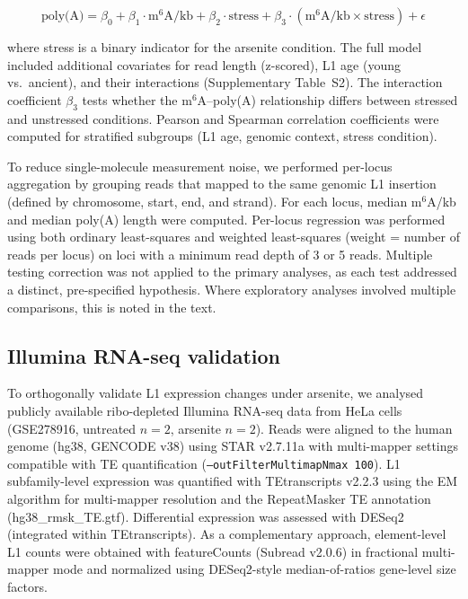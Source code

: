 \documentclass[11pt]{article}
\newcommand{\msix}{m$^6$A}
\begin{document}
\begin{equation}
\text{poly(A)} = \beta_0 + \beta_1 \cdot \text{\msix{}/kb} + \beta_2 \cdot \text{stress} + \beta_3 \cdot (\text{\msix{}/kb} \times \text{stress}) + \epsilon
\end{equation}

\noindent where stress is a binary indicator for the arsenite condition.
The full model included additional covariates for read length (z-scored),
L1 age (young vs.\ ancient), and their interactions
(Supplementary Table~S2).
The interaction coefficient $\beta_3$ tests whether the \msix{}--poly(A)
relationship differs between stressed and unstressed conditions. Pearson
and Spearman correlation coefficients were computed for stratified
subgroups (L1 age, genomic context, stress condition).

To reduce single-molecule measurement noise, we performed per-locus
aggregation by grouping reads that mapped to the same genomic L1
insertion (defined by chromosome, start, end, and strand). For each
locus, median \msix{}/kb and median poly(A) length were computed.
Per-locus regression was performed using both ordinary least-squares
and weighted least-squares (weight = number of reads per locus) on
loci with a minimum read depth of 3 or 5 reads. Multiple testing
correction was not applied to the primary analyses, as each test
addressed a distinct, pre-specified hypothesis. Where exploratory
analyses involved multiple comparisons, this is noted in the text.

\subsection*{Illumina RNA-seq validation}

To orthogonally validate L1 expression changes under arsenite,
we analysed publicly available ribo-depleted Illumina RNA-seq data from
HeLa cells (GSE278916, untreated $n=2$, arsenite $n=2$). Reads were
aligned to the human genome (hg38, GENCODE v38) using STAR v2.7.11a with
multi-mapper settings compatible with TE quantification
(\texttt{--outFilterMultimapNmax 100}). L1 subfamily-level expression
was quantified with TEtranscripts v2.2.3 using the EM algorithm for
multi-mapper resolution and the RepeatMasker TE annotation
(hg38\_rmsk\_TE.gtf). Differential expression was assessed with
DESeq2 (integrated within TEtranscripts). As a complementary approach,
element-level L1 counts were obtained with featureCounts (Subread v2.0.6)
in fractional multi-mapper mode and normalized using DESeq2-style
median-of-ratios gene-level size factors.
\end{document}
